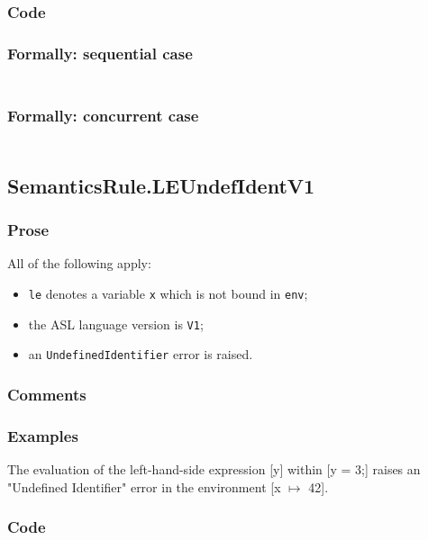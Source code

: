 \documentclass{book}
\begin{document}
  \subsubsection{Code}

  \subsubsection{Formally: sequential case}
  \begin{align}
  \end{align} 

  \subsubsection{Formally: concurrent case}
  \begin{align}
  \end{align} 

\subsection{SemanticsRule.LEUndefIdentV1 \label{sec:SemanticsRule.LEUndefIdentV1}}

    \subsubsection{Prose}
    All of the following apply:
    \begin{itemize}
    \item \texttt{le} denotes a variable \texttt{x} which is not bound in \texttt{env};
    \item the ASL language version is \texttt{V1};
    \item an \texttt{UndefinedIdentifier} error is raised.
    \end{itemize}

    \subsubsection{Comments}

    \subsubsection{Examples}
    The evaluation of the left-hand-side expression [y] within [y = 3;] raises an "Undefined Identifier" error in the environment [x $\mapsto$ 42].

  \subsubsection{Code}
\end{document}
